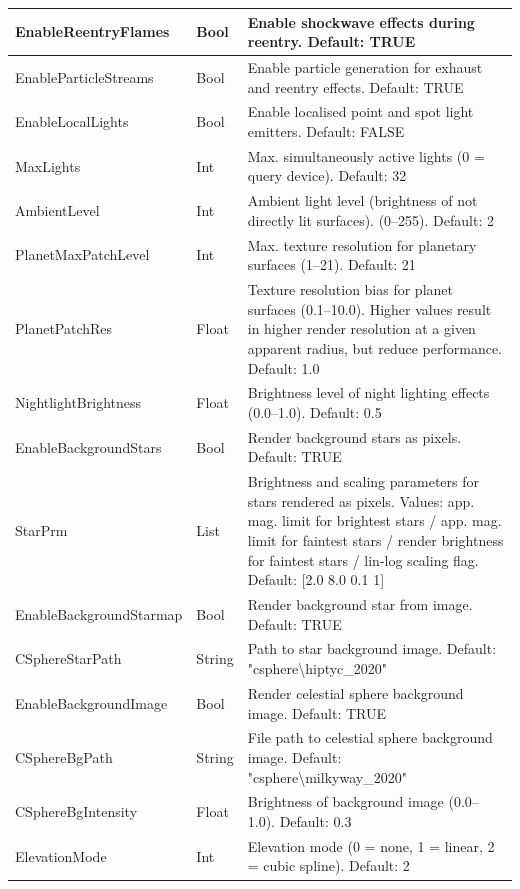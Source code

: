 \documentclass[Orbiter User Manual.tex]{subfiles}
\begin{document}
\begin{longtable}{ p{} p{}
		>{\RaggedRight}p{} }
	\hline
	EnableReentryFlames & Bool & Enable shockwave effects during reentry.
		Default: TRUE\\
	\hline
	EnableParticleStreams & Bool & Enable particle generation for exhaust and
		reentry effects. Default: TRUE\\
	\hline
	EnableLocalLights & Bool & Enable localised point and spot light emitters.
		Default: FALSE\\
	\hline
	MaxLights & Int & Max. simultaneously active lights (0 = query device).
		Default: 32\\
	\hline
	AmbientLevel & Int & Ambient light level (brightness of not directly lit
		surfaces). (0--255). Default: 2\\
	\hline
	PlanetMaxPatchLevel & Int & Max. texture resolution for planetary surfaces
		(1--21). Default: 21\\
	\hline
	PlanetPatchRes & Float & Texture resolution bias for planet surfaces
		(0.1--10.0). Higher values result in higher render resolution at a given
		apparent radius, but reduce performance. Default: 1.0\\
	\hline
	NightlightBrightness & Float & Brightness level of night lighting effects
		(0.0--1.0). Default: 0.5\\
	\hline
	EnableBackgroundStars & Bool & Render background stars as pixels. Default:
		TRUE\\
	\hline
	StarPrm & List & Brightness and scaling parameters for stars rendered as
		pixels. Values: app. mag. limit for brightest stars / app. mag. limit
		for faintest stars / render brightness for faintest stars / lin-log
		scaling flag. Default: [2.0 8.0 0.1 1]\\
	\hline
	EnableBackgroundStarmap & Bool & Render background star from image. Default:
		TRUE\\
	\hline
	CSphereStarPath & String & Path to star background image. Default:
		"csphere\textbackslash hiptyc\_2020"\\
	\hline
	EnableBackgroundImage & Bool & Render celestial sphere background image.
		Default: TRUE\\
	\hline
	CSphereBgPath & String & File path to celestial sphere background image.
		Default: "csphere\textbackslash milkyway\_2020"\\
	\hline
	CSphereBgIntensity & Float & Brightness of background image (0.0--1.0).
		Default: 0.3\\
	\hline
	ElevationMode & Int & Elevation mode (0 = none, 1 = linear, 2 = cubic
		spline). Default: 2\\

\end{longtable}
\end{document}
